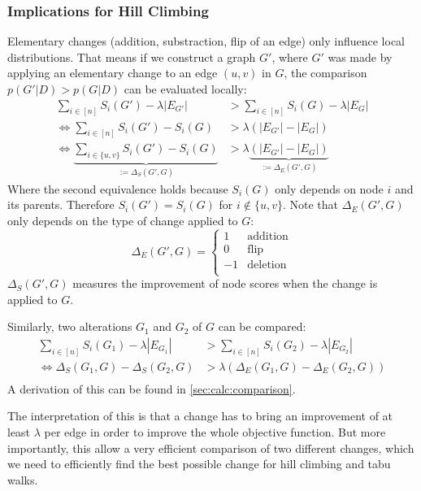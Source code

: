 \documentclass[sigconf, fleqn, prologue, dvipsnames]{acmart}
\newcommand{\set}[1]{\{#1\}}
\newcommand{\abs}[1]{\left\vert #1 \right\vert}
\begin{document}
\subsubsection{Implications for Hill Climbing}
\label{sec:methods:score:implications}
Elementary changes (addition, substraction, flip of an edge) only influence local distributions.
That means if we construct a graph $G'$, where $G'$ was made by applying an elementary change to an edge $(u, v)$ in $G$, the comparison $p(G' | D) > p(G | D)$ can be evaluated locally:
\begin{align*}
	\sum\limits_{i \in [n]} S_i(G') - \lambda \abs{E_{G'}}                               & > \sum\limits_{i \in [n]} S_i(G) - \lambda \abs{E_{G}}                  \\
	\iff\sum\limits_{i \in [n]} S_i(G') - S_i(G)                                         & > \lambda (\abs{E_{G'}} - \abs{E_{G}})                                  \\
	\iff\underbrace{\sum\limits_{i \in \set{u,v}} S_i(G') - S_i(G)}_{:= \Delta_S(G', G)} & > \lambda \underbrace{(\abs{E_{G'}} - \abs{E_{G}})}_{:= \Delta_E(G',G)}
\end{align*}
Where the second equivalence holds because $S_i(G)$ only depends on node $i$ and its parents.
Therefore $S_i(G') = S_i(G)$ for $i \notin \set{u, v}$.
Note that $\Delta_E(G',G)$ only depends on the type of change applied to $G$:
$$
	\Delta_E(G',G) = \begin{cases}
		1  & \text{addition} \\
		0  & \text{flip}     \\
		-1 & \text{deletion} \\
	\end{cases}
$$
$\Delta_S(G', G)$ measures the improvement of node scores when the change is applied to $G$.

Similarly, two alterations $G_1$ and $G_2$ of $G$ can be compared:
\begin{align*}
	\sum\limits_{i \in [n]} S_i(G_1) - \lambda \abs{E_{G_1}} & > \sum\limits_{i \in [n]} S_i(G_2) - \lambda \abs{E_{G_2}} \\
	\iff \Delta_S(G_1, G) - \Delta_S(G_2, G)                 & > \lambda \left(\Delta_E(G_1,G) - \Delta_E(G_2,G)\right)   \\
\end{align*}
A derivation of this can be found in \autoref{sec:calc:comparison}.

The interpretation of this is that a change has to bring an improvement of at least $\lambda$ per edge in order to improve the whole objective function.
But more importantly, this allow a very efficient comparison of two different changes, which we need to efficiently find the best possible change for hill climbing and tabu walks.
\end{document}
